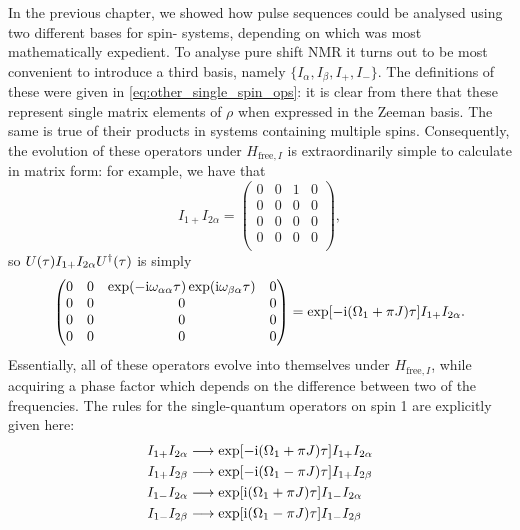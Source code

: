 In the previous chapter, we showed how pulse sequences could be analysed using two different bases for spin-\half{} systems, depending on which was most mathematically expedient.
To analyse pure shift NMR it turns out to be most convenient to introduce a third basis, namely $\{I_\alpha, I_\beta, I_+, I_-\}$\autocite{Keeler2010,Thrippleton2005JMR,Griesinger1986JCP}.
The definitions of these were given in \cref{eq:other_single_spin_ops}: it is clear from there that these represent single matrix elements of $\rho$ when expressed in the Zeeman basis.
The same is true of their products in systems containing multiple spins.
Consequently, the evolution of these operators under $H_{\text{free},I}$ is extraordinarily simple to calculate in matrix form: for example, we have that
\begin{equation}
    \label{eq:single_elem_plusalpha_evolution}
    I_{1+}I_{2\alpha} = \begin{pmatrix}
        0 & 0 & 1 & 0 \\
        0 & 0 & 0 & 0 \\
        0 & 0 & 0 & 0 \\
        0 & 0 & 0 & 0 \\
    \end{pmatrix},
\end{equation}
so $U(\tau) I_{1+} I_{2\alpha} U^\dagger(\tau)$ is simply
\begin{equation}
    \label{eq:single_elem_plusalpha_evolution_2}
    \begin{pmatrix}
        0 & 0 & \exp(-\mathrm{i}\omega_{\alpha\alpha}\tau)\exp(\mathrm{i}\omega_{\beta\alpha}\tau) & 0 \\
        0 & 0 & 0 & 0 \\
        0 & 0 & 0 & 0 \\
        0 & 0 & 0 & 0 \\
    \end{pmatrix} = \exp[-\mathrm{i}(\Omega_1 + \pi J)\tau] I_{1+}I_{2\alpha}.
\end{equation}
Essentially, all of these operators evolve into themselves under $H_{\text{free},I}$, while acquiring a phase factor which depends on the difference between two of the frequencies.
The rules for the single-quantum operators on spin 1 are explicitly given here:
\begin{align}
    I_{1+}I_{2\alpha} &\longrightarrow \exp[-\mathrm{i}(\Omega_1 + \pi J)\tau] I_{1+}I_{2\alpha} \label{eq:shift_basis_evolution_pa} \\
    I_{1+}I_{2\beta} &\longrightarrow \exp[-\mathrm{i}(\Omega_1 - \pi J)\tau] I_{1+}I_{2\beta} \label{eq:shift_basis_evolution_pb} \\
    I_{1-}I_{2\alpha} &\longrightarrow \exp[\mathrm{i}(\Omega_1 + \pi J)\tau] I_{1-}I_{2\alpha} \label{eq:shift_basis_evolution_ma} \\
    I_{1-}I_{2\beta} &\longrightarrow \exp[\mathrm{i}(\Omega_1 - \pi J)\tau] I_{1-}I_{2\beta} \label{eq:shift_basis_evolution_mb}
\end{align}
